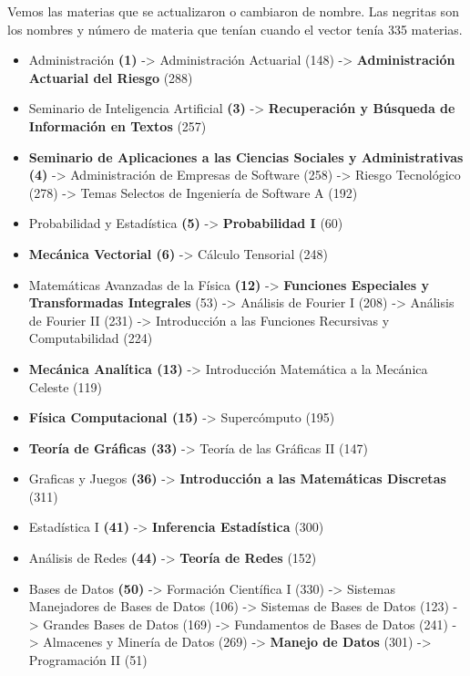 \begin{appendices}
Vemos las materias que se actualizaron o cambiaron de nombre. Las negritas son los nombres y número de materia que tenían cuando el vector tenía 335 materias.


  \begin{itemize}
  \item Administración \textbf{(1)} -> Administración Actuarial (148) -> \textbf{Administración Actuarial del Riesgo} (288)
  
  \item Seminario de Inteligencia Artificial \textbf{(3)} -> \textbf{Recuperación y Búsqueda de Información en Textos} (257)
  
  \item \textbf{Seminario de Aplicaciones a las Ciencias Sociales y Administrativas (4)} -> Administración de Empresas de Software (258) -> Riesgo Tecnológico (278) -> Temas Selectos de Ingeniería de Software A (192)
  
  \item Probabilidad y Estadística \textbf{(5)} -> \textbf{Probabilidad I} (60)

\item \textbf{Mecánica Vectorial (6)} -> Cálculo Tensorial (248)

  
  \item Matemáticas Avanzadas de la Física \textbf{(12)} -> \textbf{Funciones Especiales y Transformadas Integrales} (53) -> Análisis de Fourier I (208) -> Análisis de Fourier II (231) -> Introducción a las Funciones Recursivas y Computabilidad (224)

  \item \textbf{Mecánica Analítica (13)} -> Introducción Matemática a la Mecánica Celeste (119)

  \item \textbf{Física Computacional (15)} -> Supercómputo (195)

  \item \textbf{Teoría de Gráficas (33)} -> Teoría de las Gráficas II (147)
  
  \item Graficas y Juegos \textbf{(36)} -> \textbf{Introducción a las Matemáticas Discretas} (311)
  
  \item Estadística I \textbf{(41)} -> \textbf{Inferencia Estadística} (300)
  
  \item Análisis de Redes \textbf{(44)} -> \textbf{Teoría de Redes} (152)
  
  \item Bases de Datos \textbf{(50)} -> Formación Científica I (330) -> Sistemas Manejadores de Bases de Datos (106) -> Sistemas de Bases de Datos (123) -> Grandes Bases de Datos (169) -> Fundamentos de Bases de Datos (241) -> Almacenes y Minería de Datos (269) -> \textbf{Manejo de Datos} (301) -> Programación II (51)
  

\end{itemize}
\end{appendices}
